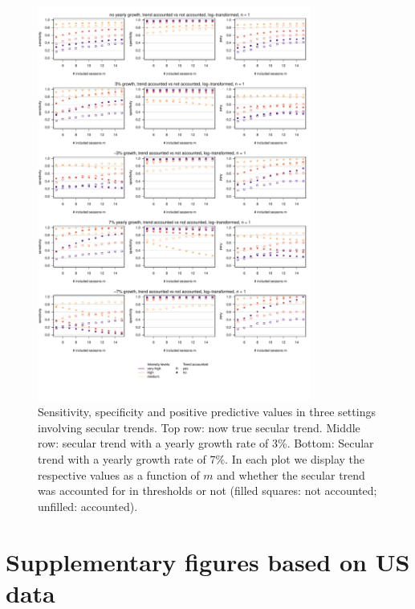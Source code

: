 \documentclass[12pt]{article}
\begin{document}
\newpage


\begin{figure}[h!]
\begin{center}
\includegraphics[width = 0.8\textwidth]{figure/plot_cost_trend_fr.pdf}
\end{center}
\vspace{-10mm}
\caption{Sensitivity, specificity and positive predictive values in three settings involving secular trends. Top row: now true secular trend. Middle row: secular trend with a yearly growth rate of 3\%. Bottom: Secular trend with a yearly growth rate of 7\%. In each plot we display the respective values as a function of $m$ and whether the secular trend was accounted for in thresholds or not (filled squares: not accounted; unfilled: accounted).}
\label{fig:cost_trend}
\end{figure}

\newpage

\section{Supplementary figures based on US data}
\label{suppl:us}
\end{document}

